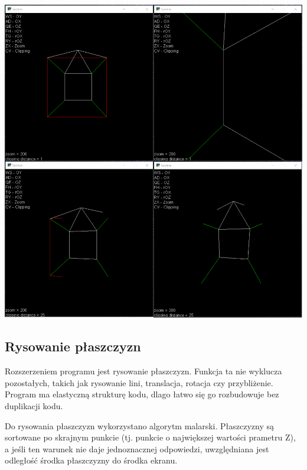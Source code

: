 \documentclass[12pt]{article}
\begin{document}
\begin{center}
    \noindent\includegraphics[scale=0.5]{spolens clip.png}
\end{center}
\newpage

\subsection{Rysowanie płaszczyzn}
Rozszerzeniem programu jest rysowanie płaszczyzn. Funkcja ta nie wyklucza pozostałych, takich jak rysowanie lini, translacja, rotacja czy przybliżenie. Program ma elastyczną strukturę kodu, dlago łatwo się go rozbudowuje bez duplikacji kodu.

Do rysowania płaszczyzn wykorzystano algorytm malarski. Płaszczyzny są sortowane po skrajnym punkcie (tj. punkcie o największej wartości prametru Z), a jeśli ten warunek nie daje jednoznacznej odpowiedzi, uwzględniana jest odległość środka płaszczyzny do środka ekranu.
\end{document}
